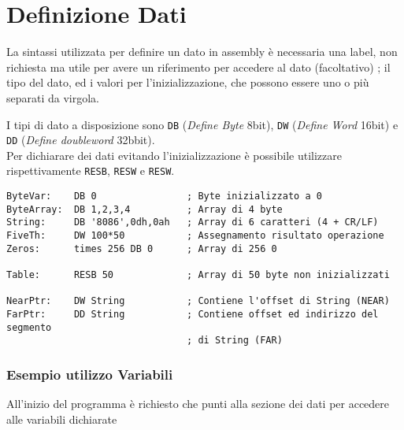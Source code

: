 \documentclass[../template]{subfiles}
\begin{document}
\section{Definizione Dati}
La sintassi utilizzata per definire un dato in assembly è
necessaria una label, non richiesta ma utile per avere un riferimento per accedere al dato (facoltativo) ;
il tipo del dato, ed i valori per l'inizializzazione, che possono essere uno o più separati da virgola.

I tipi di dato a disposizione sono \lstinline{DB} (\textit{Define Byte} 8bit), \lstinline{DW} (\textit{Define Word} 16bit) e \lstinline{DD} (\textit{Define doubleword} 32bbit).
\\
Per dichiarare dei dati evitando l'inizializzazione è possibile utilizzare rispettivamente \lstinline{RESB}, \lstinline{RESW} e \lstinline{RESW}.

\begin{lstlisting}
ByteVar:    DB 0                ; Byte inizializzato a 0
ByteArray:  DB 1,2,3,4          ; Array di 4 byte
String:     DB '8086',0dh,0ah   ; Array di 6 caratteri (4 + CR/LF)
FiveTh:     DW 100*50           ; Assegnamento risultato operazione
Zeros:      times 256 DB 0      ; Array di 256 0

Table:      RESB 50             ; Array di 50 byte non inizializzati

NearPtr:    DW String           ; Contiene l'offset di String (NEAR)
FarPtr:     DD String           ; Contiene offset ed indirizzo del segmento
                                ; di String (FAR)
\end{lstlisting}

\subsubsection{Esempio utilizzo Variabili}

All'inizio del programma è richiesto che \ds punti alla sezione dei dati per accedere alle variabili dichiarate
\end{document}
